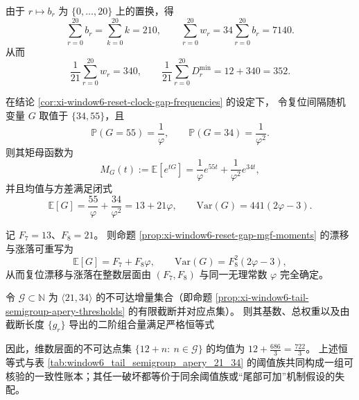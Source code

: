 \begin{proposition}\label{prop:xi-window6-apery-first-moment}
由于 \(r\mapsto b_r\) 为 \(\{0,\dots,20\}\) 上的置换，得
\[
\sum_{r=0}^{20}b_r=\sum_{k=0}^{20}k=210,
\qquad
\sum_{r=0}^{20}w_r=34\sum_{r=0}^{20}b_r=7140.
\]
从而
\[
\frac{1}{21}\sum_{r=0}^{20}w_r=340,
\qquad
\frac{1}{21}\sum_{r=0}^{20}D_r^{\min}=12+340=352.
\]
\end{proposition}

\begin{proposition}[两间隔复位时钟的显式矩不变量]\label{prop:xi-window6-reset-gap-mgf-moments}
在结论 \ref{cor:xi-window6-reset-clock-gap-frequencies} 的设定下，
令复位间隔随机变量 \(G\) 取值于 \(\{34,55\}\)，且
\[
\mathbb P(G=55)=\frac{1}{\varphi},\qquad \mathbb P(G=34)=\frac{1}{\varphi^2}.
\]
则其矩母函数为
\[
M_G(t):=\mathbb E[e^{tG}]
=\frac{1}{\varphi}e^{55t}+\frac{1}{\varphi^2}e^{34t},
\]
并且均值与方差满足闭式
\[
\mathbb E[G]=\frac{55}{\varphi}+\frac{34}{\varphi^2}=13+21\varphi,
\qquad
\mathrm{Var}(G)=441(2\varphi-3).
\]
\end{proposition}

\begin{corollary}\label{cor:xi-window6-reset-gap-fib-coupling}
记 \(F_7=13\)、\(F_8=21\)。
则命题 \ref{prop:xi-window6-reset-gap-mgf-moments} 的漂移与涨落可重写为
\[
\mathbb E[G]=F_7+F_8\varphi,
\qquad
\mathrm{Var}(G)=F_8^2(2\varphi-3),
\]
从而复位漂移与涨落在整数层面由 \((F_7,F_8)\) 与同一无理常数 \(\varphi\) 完全确定。
\end{corollary}

\begin{proposition}[不可达集合的质量不变量与二阶一致性账本]\label{prop:xi-window6-gap-ledger-invariants}
令 \(\mathcal G\subset\mathbb N\) 为 \(\langle 21,34\rangle\) 的不可达增量集合（即命题 \ref{prop:xi-window6-tail-semigroup-apery-thresholds} 的有限截断并对应点集）。
则其基数、总权重以及由截断长度 \(\{g_r\}\) 导出的二阶组合量满足严格恒等式

因此，维数层面的不可达点集 \(\{12+n:\ n\in\mathcal G\}\) 的均值为 \(12+\frac{686}{3}=\frac{722}{3}\)。
上述恒等式与表 \ref{tab:window6_tail_semigroup_apery_21_34} 的阈值族共同构成一组可核验的一致性账本；其任一破坏都等价于同余阈值族或“尾部可加”机制假设的失配。
\end{proposition}

